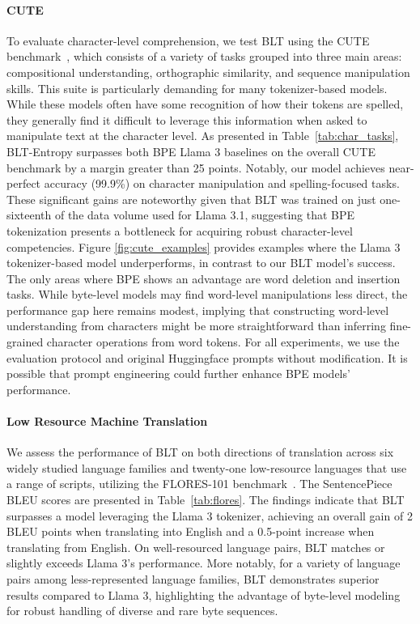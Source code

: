 \paragraph{CUTE}
To evaluate character-level comprehension, we test {\textsc BLT} using the CUTE benchmark~\citep{edman2024cute}, which consists of a variety of tasks grouped into three main areas: compositional understanding, orthographic similarity, and sequence manipulation skills. This suite is particularly demanding for many tokenizer-based models. While these models often have some recognition of how their tokens are spelled, they generally find it difficult to leverage this information when asked to manipulate text at the character level. As presented in Table~\ref{tab:char_tasks}, {\textsc BLT}-Entropy surpasses both BPE Llama 3 baselines on the overall CUTE benchmark by a margin greater than 25 points. Notably, our model achieves near-perfect accuracy (99.9\%) on character manipulation and spelling-focused tasks. These significant gains are noteworthy given that {\textsc BLT} was trained on just one-sixteenth of the data volume used for Llama 3.1, suggesting that BPE tokenization presents a bottleneck for acquiring robust character-level competencies. Figure \ref{fig:cute_examples} provides examples where the Llama 3 tokenizer-based model underperforms, in contrast to our {\textsc BLT} model’s success. The only areas where BPE shows an advantage are word deletion and insertion tasks. While byte-level models may find word-level manipulations less direct, the performance gap here remains modest, implying that constructing word-level understanding from characters might be more straightforward than inferring fine-grained character operations from word tokens. For all experiments, we use the evaluation protocol and original Huggingface prompts without modification. It is possible that prompt engineering could further enhance BPE models’ performance.

\paragraph{Low Resource Machine Translation} We assess the performance of {\textsc BLT} on both directions of translation across six widely studied language families and twenty-one low-resource languages that use a range of scripts, utilizing the FLORES-101 benchmark~\citep{goyal2022flores}. The SentencePiece BLEU scores are presented in Table~\ref{tab:flores}. The findings indicate that {\textsc BLT} surpasses a model leveraging the Llama 3 tokenizer, achieving an overall gain of 2 BLEU points when translating into English and a 0.5-point increase when translating from English. On well-resourced language pairs, {\textsc BLT} matches or slightly exceeds Llama 3's performance. More notably, for a variety of language pairs among less-represented language families, {\textsc BLT} demonstrates superior results compared to Llama 3, highlighting the advantage of byte-level modeling for robust handling of diverse and rare byte sequences.

